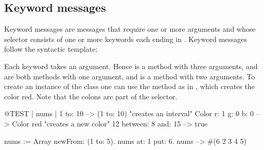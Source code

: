 \documentclass[a4paper,10pt,twoside]{book}
\begin{document}

\subsection{Keyword messages}

Keyword messages are messages that require one or more arguments and whose selector consists of one or more keywords each ending in \ct{:}.
Keyword messages follow the syntactic template:

Each keyword takes an argument.
Hence  is a method with three arguments,  and  are both methods with one argument, and  is a method with two arguments.
To create an instance of the class  one can use the method  as in , which creates the color red.
Note that the colons are part of the selector.


\begin{code}{@TEST | nums |}
1 to: 10                        --> (1 to: 10)  "creates an interval"
Color r: 1 g: 0 b: 0       --> Color red  "creates a new color"
12 between: 8 and: 15 --> true

nums := Array newFrom: (1 to: 5).
nums at: 1 put: 6.
nums --> #(6 2 3 4 5)
\end{code}


\end{document}
